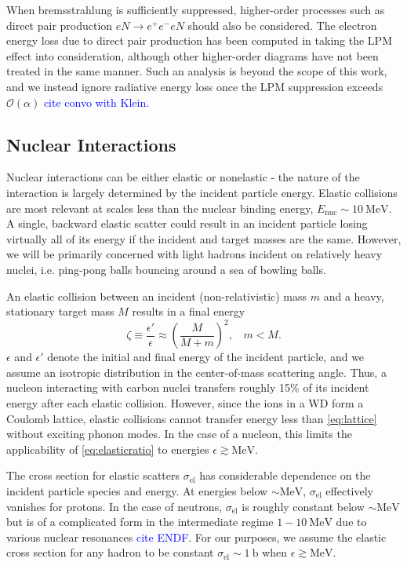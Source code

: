 \documentclass[twocolumn,showpacs,preprintnumbers,amsmath,amssymb,prd]{revtex4}
\newcommand{\OO}{\mathcal{O}}
\def\r{\right)}
\def\l{\left(}
\begin{document}
\begin{appendices}
When bremsstrahlung is sufficiently suppressed, higher-order processes such as direct pair production $e N \rightarrow e^+ e^- e N$ should also be considered. The electron energy loss due to direct pair production has been computed in \cite{Gerhardt:2010bj} taking the LPM effect into consideration, although other higher-order diagrams have not been treated in the same manner. Such an analysis is beyond the scope of this work, and we instead ignore radiative energy loss once the LPM suppression exceeds $\OO(\alpha)$ \textcolor{blue}{cite convo with Klein.}

\subsection*{Nuclear Interactions}
Nuclear interactions can be either elastic or nonelastic - the nature of the interaction is largely determined by the incident particle energy. Elastic collisions are most relevant at scales less than the nuclear binding energy, $E_\text{nuc} \sim 10 ~\text{MeV}$. A single, backward elastic scatter could result in an incident particle losing virtually all of its energy if the incident and target masses are the same. However, we will be primarily concerned with light hadrons incident on relatively heavy nuclei, i.e. ping-pong balls bouncing around a sea of bowling balls.

An elastic collision between an incident (non-relativistic) mass $m$ and a heavy, stationary target mass $M$ results in a final energy
\begin{equation}
\label{eq:elasticratio}
\zeta \equiv \frac{\epsilon'}{\epsilon} \approx \l \frac{M}{M+m} \r^2, ~~~~ m < M.
\end{equation}
$\epsilon$ and $\epsilon'$ denote the initial and final energy of the incident particle, and we assume an isotropic distribution in the center-of-mass scattering angle. Thus, a nucleon interacting with carbon nuclei transfers roughly 15\% of its incident energy after each elastic collision. However, since the ions in a WD form a Coulomb lattice, elastic collisions cannot transfer energy less than \eqref{eq:lattice} without exciting phonon modes. In the case of a nucleon, this limits the applicability of \eqref{eq:elasticratio} to energies $\epsilon \gtrsim \text{MeV}$.

The cross section for elastic scatters $\sigma_\text{el}$ has considerable dependence on the incident particle species and energy. At energies below $\sim \text{MeV}$, $\sigma_\text{el}$ effectively vanishes for protons. In the case of neutrons, $\sigma_\text{el}$ is roughly constant below $\sim \text{MeV}$ but is of a complicated form in the intermediate regime $1 - 10 ~\text{MeV}$ due to various nuclear resonances \textcolor{blue}{cite ENDF}. For our purposes, we assume the elastic cross section for any hadron to be constant $\sigma_\text{el} \sim 1 ~\text{b}$ when $\epsilon \gtrsim \text{MeV}$.


\end{appendices}
\end{document}
